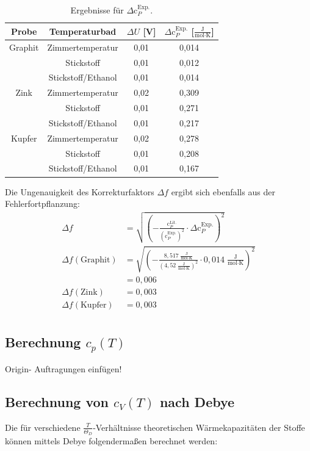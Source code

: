 \documentclass[12pt,a4paper,titlepage,headinclude,bibtotoc]{scrartcl}
\begin{document}
\begin{table}[h!]
\centering
\caption{Ergebnisse für $\Delta \text{c}_P^{\text{Exp.}}$.}
\begin{tabular}{c|c|c|c}
Probe&Temperaturbad&$\Delta U$ [V]&$\Delta \text{c}_P^{\text{Exp.}}$ [$\frac{\text{J}}{\text{mol}\cdot\text{K}}$]\\
\hline
Graphit& Zimmertemperatur&0,01&0,014\\
\hline
&Stickstoff&0,01&0,012\\
\hline
&Stickstoff/Ethanol&0,01&0,014\\
\hline
Zink &Zimmertemperatur&0,02& 0,309 \\
\hline
&Stickstoff&0,01&0,271\\
\hline
&Stickstoff/Ethanol&0,01&0,217\\
\hline
Kupfer &Zimmertemperatur&0,02& 0,278\\
\hline
&Stickstoff&0,01&0,208\\
\hline
&Stickstoff/Ethanol&0,01&0,167\\
\end{tabular}
\end{table}
\FloatBarrier
Die Ungenauigkeit des Korrekturfaktors $\Delta f$ ergibt sich ebenfalls aus der Fehlerfortpflanzung:
\begin{align}
\Delta f &= \sqrt{ \left(-\frac{\text{c}_P^{\text{Lit.}}}{(\text{c}_P^{\text{Exp.}})^2}\cdot \Delta \text{c}_P^{\text{Exp.}} \right)^2}\\
\Delta f (\text{Graphit})&= \sqrt{ \left(-\frac{8,517\;\frac{\text{J}}{\text{mol}\cdot\text{K}}}{(4,52\;\frac{\text{J}}{\text{mol}\cdot\text{K}})^2}\cdot 0,014\;\frac{\text{J}}{\text{mol}\cdot\text{K}}\right)^2}\\
&= 0,006\\
\Delta f (\text{Zink})&=0,003\\ 
\Delta f (\text{Kupfer})&=0,003\\
\end{align} 
\subsection{Berechnung $c_{p}(T)$}
  
Origin- Auftragungen einfügen!  
  
  

\subsection{Berechnung von $c_{V}(T)$ nach Debye}
Die für verschiedene $\frac{T}{\Theta_{D}}$-Verhältnisse theoretischen Wärmekapazitäten der Stoffe können mittels Debye folgendermaßen berechnet werden:\\
\end{document}
